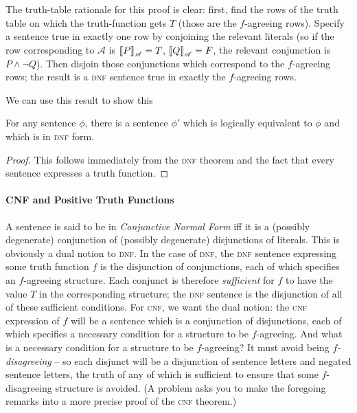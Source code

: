 The truth-table rationale for this proof is clear: first, find the rows of the truth table on which the truth-function gets $T$ (those are the $f$-agreeing rows). Specify a sentence true in exactly one row by conjoining the relevant literals (so if the row corresponding to $\mathscr{A}$ is $\left\llbracket P\right\rrbracket_{\mathscr{A}}=T$, $\left\llbracket Q\right\rrbracket_{\mathscr{A}}=F$, the relevant conjunction is $P \wedge \neg Q$). Then disjoin those conjunctions which correspond to the $f$-agreeing rows; the result is a \textsc{\lowercase{DNF}} sentence true in exactly the $f$-agreeing rows. 

We can use this result to show this \begin{corol}
	For any sentence $\phi$, there is a sentence $\phi'$ which is logically equivalent to $\phi$ and which is in \textsc{\lowercase{DNF}} form. \begin{proof}
		This follows immediately from the \textsc{\lowercase{DNF}} theorem and the fact that every sentence expresses a truth function.
	\end{proof} 
\end{corol} 


\paragraph{CNF and Positive Truth Functions}

A sentence is said to be in \emph{Conjunctive Normal Form} iff it is a (possibly degenerate) conjunction of (possibly degenerate) disjunctions of literals. This is obviously a dual notion to \textsc{\lowercase{DNF}}.
In the case of \textsc{\lowercase{DNF}}, the \textsc{\lowercase{DNF}} sentence expressing some truth function $f$ is the disjunction of conjunctions, each of which specifies an $f$-agreeing structure. Each conjunct is therefore \emph{sufficient} for $f$ to have the value $T$ in the corresponding structure; the \textsc{\lowercase{DNF}} sentence is the disjunction of all of these sufficient conditions. For \textsc{\lowercase{CNF}}, we want the dual notion: the \textsc{\lowercase{CNF}} expression of $f$ will be a sentence which is a conjunction of disjunctions, each of which specifies a  necessary condition for a structure to be $f$-agreeing. And what is a necessary condition for a structure to be $f$-agreeing? It must avoid being \emph{$f$-disagreeing} – so each disjunct will be a disjunction of sentence letters and negated sentence letters, the truth of any of which is sufficient to ensure that some $f$-disagreeing structure is avoided.  (A problem asks you to make the foregoing remarks into a more precise proof of the \textsc{\lowercase{CNF}} theorem.)


